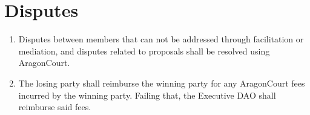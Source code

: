 \section{Disputes}

\begin{enumerate}
	\item Disputes between members that can not be addressed through facilitation or mediation, and disputes related to proposals shall be resolved using \gls{AragonCourt}.
	\item The losing party shall reimburse the winning party for any \gls{AragonCourt} fees incurred by the winning party. Failing that, the Executive \ac{DAO} shall reimburse said fees.
\end{enumerate}


